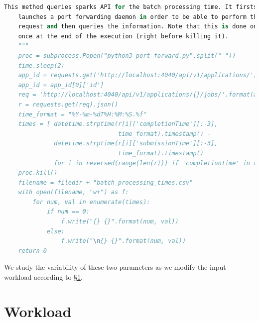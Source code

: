 \begin{enumerate}
\begin{lstlisting}[language=Python,caption={Snippet illustrating a query to Spark's REST API.},label=code:evaluation:requests]
    This method queries sparks API for the batch processing time. It firsts
    launches a port forwarding daemon in order to be able to perform the
    request and then queries the information. Note that this is done only
    once at the end of the execution (right before killing it).
    """
    proc = subprocess.Popen("python3 port_forward.py".split(" "))
    time.sleep(2)
    app_id = requests.get('http://localhost:4040/api/v1/applications/').json()
    app_id = app_id[0]['id']
    req = 'http://localhost:4040/api/v1/applications/{}/jobs/'.format(app_id)
    r = requests.get(req).json()
    time_format = "%Y-%m-%dT%H:%M:%S.%f"
    times = [ datetime.strptime(r[i]['completionTime'][:-3],
                                time_format).timestamp() -
              datetime.strptime(r[i]['submissionTime'][:-3],
                                time_format).timestamp()
              for i in reversed(range(len(r))) if 'completionTime' in r[i] ]
    proc.kill()
    filename = filedir + "batch_processing_times.csv"
    with open(filename, "w+") as f:
        for num, val in enumerate(times):
            if num == 0:
                f.write("{} {}".format(num, val))
            else:
                f.write("\n{} {}".format(num, val))
    return 0
\end{lstlisting}
\end{enumerate}
We study the variability of these two parameters as we modify the input workload according to \S\ref{sec:evaluation:workload}.

\vspace{-20pt}

\section{Workload} \label{sec:evaluation:workload}

